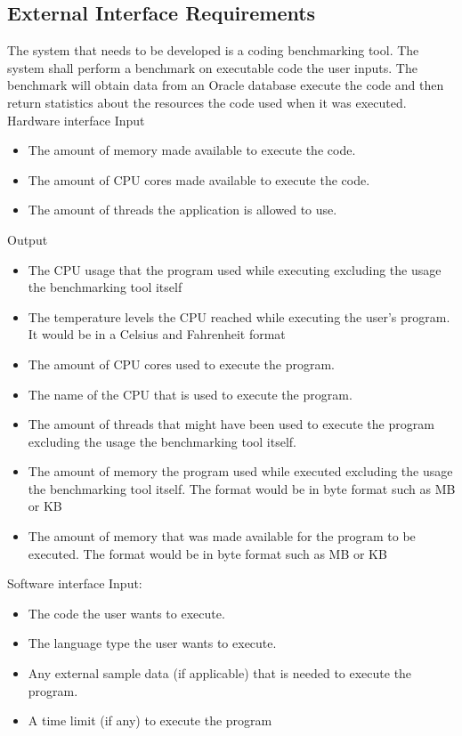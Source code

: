 \documentclass[a4paper,12pt]{article}
\begin{document}
\subsection{External Interface Requirements}
The system that needs to be developed is a coding benchmarking tool. The system shall perform a benchmark on executable code the user inputs. The benchmark will obtain data from an Oracle database execute the code and then return statistics about the resources the code used when it was executed.
Hardware interface
Input
\begin{itemize}
\item The amount of memory made available to execute the code.
\item The amount of CPU cores made available to execute the code. 
\item The amount of threads the application is allowed to use.
\end{itemize}
Output
\begin{itemize}
\item The CPU usage that the program used while executing excluding the usage the benchmarking tool itself
\item The temperature levels the CPU reached while executing the user's program. It would be in a Celsius and Fahrenheit format
\item The amount of CPU cores used to execute the program.
\item The name of the CPU that is used to execute the program. 
\item The amount of threads that might have been used to execute the program excluding the usage the benchmarking tool itself. 
\item The amount of memory the program used while executed excluding the usage the benchmarking tool itself. The format would be in byte format such as MB or KB
\item The amount of memory that was made available for the program to be executed. The format would be in byte format such as MB or KB
\end{itemize}
Software interface
Input:
\begin{itemize}
\item The code the user wants to execute.
\item The language type the user wants to execute.
\item Any external  sample data (if applicable) that is needed to execute the program.
\item A time limit (if any) to execute the program
\end{itemize}
\end{document}
